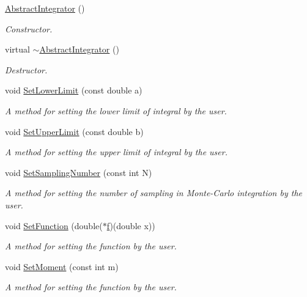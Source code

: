 \begin{DoxyCompactItemize}
\item 
\hyperlink{class_abstract_integrator_aa88168bae2057a179c9ecc2ba9639f61}{Abstract\+Integrator} ()
\begin{DoxyCompactList}\small\item\em Constructor. \end{DoxyCompactList}\item 
virtual \hyperlink{class_abstract_integrator_addc528450d3f1d6e5d2cbd81e7d545e0}{$\sim$\+Abstract\+Integrator} ()
\begin{DoxyCompactList}\small\item\em Destructor. \end{DoxyCompactList}\item 
void \hyperlink{class_abstract_integrator_aea1949bda48ee6f4501475e8da26aaeb}{Set\+Lower\+Limit} (const double a)
\begin{DoxyCompactList}\small\item\em A method for setting the lower limit of integral by the user. \end{DoxyCompactList}\item 
void \hyperlink{class_abstract_integrator_a341070bf2dca9e2ac113d388e6d06556}{Set\+Upper\+Limit} (const double b)
\begin{DoxyCompactList}\small\item\em A method for setting the upper limit of integral by the user. \end{DoxyCompactList}\item 
void \hyperlink{class_abstract_integrator_a48c0b007c4b18e4a229f014bb0ccf9c0}{Set\+Sampling\+Number} (const int N)
\begin{DoxyCompactList}\small\item\em A method for setting the number of sampling in Monte-\/\+Carlo integration by the user. \end{DoxyCompactList}\item 
void \hyperlink{class_abstract_integrator_a9350f10f351d5b58c6aa8e581325ff4f}{Set\+Function} (double($\ast$\hyperlink{main_8cpp_a3de2b7b41a8e4b07da05298510d17ed2}{f})(double x))
\begin{DoxyCompactList}\small\item\em A method for setting the function by the user. \end{DoxyCompactList}\item 
void \hyperlink{class_abstract_integrator_a871fa27363ee09b98c964ccaa33da100}{Set\+Moment} (const int m)
\begin{DoxyCompactList}\small\item\em A method for setting the function by the user. \end{DoxyCompactList}\item 

\end{DoxyCompactItemize}
